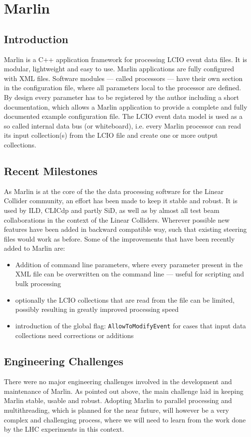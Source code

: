 \section{Marlin}

\subsection{Introduction}
Marlin\cite{Gaede2006177} is a C++ application framework for processing LCIO event data files. It is modular, lightweight and easy to use. Marlin applications are fully configured with XML files. Software modules --- called processors --- have their own section in the configuration file, where all parameters local to the processor are defined. By design every parameter has to be registered by the author including a short documentation, which allows a Marlin application to provide a complete and fully documented example configuration file. The LCIO event data model is used as a so called internal data bus (or whiteboard), i.e. every Marlin processor can read its input collection(s) from the LCIO file and create one or more output collections.

\subsection{Recent Milestones}
As Marlin is at the core of the the data processing software for the Linear Collider community, an effort has been made to keep it stable and robust. It is used by ILD, CLICdp and partly SiD, as well as by almost all test beam collaborations in the context of the Linear Colliders. Wherever possible new features have been added in backward compatible way, such that existing steering files would work as before. Some of the improvements that have been recently added to Marlin are:
\begin{itemize}
	\item Addition of command line parameters, where every parameter present in the XML file can be overwritten on the command line --- useful for scripting and bulk processing
	\item optionally the LCIO collections that are read from the file can be limited, possibly resulting in greatly improved processing speed
	\item introduction of the global flag: \texttt{AllowToModifyEvent} for cases that input data collections need corrections or additions
\end{itemize}

\subsection{Engineering Challenges}
There were no major engineering challenges involved in the development and maintenance of Marlin. As pointed out above, the main challenge laid in keeping Marlin stable, usable and robust. Adopting Marlin to parallel processing and multithreading, which is planned for the near future, will however be a very complex and challenging process, where we will need to learn from the work done by the LHC experiments in this context.

